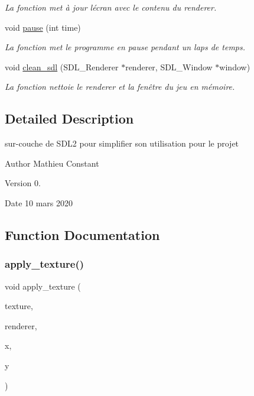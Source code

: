 \begin{DoxyCompactItemize}
\begin{DoxyCompactList}\small\item\em La fonction met à jour l\textquotesingle{}écran avec le contenu du renderer. \end{DoxyCompactList}\item 
void \hyperlink{sdl2-light_8c_a381e2d58c3d6a1f0fd8129bcc4726804}{pause} (int time)
\begin{DoxyCompactList}\small\item\em La fonction met le programme en pause pendant un laps de temps. \end{DoxyCompactList}\item 
void \hyperlink{sdl2-light_8c_a69f5b063948b40b1bac5bb2518ed9e52}{clean\+\_\+sdl} (S\+D\+L\+\_\+\+Renderer $\ast$renderer, S\+D\+L\+\_\+\+Window $\ast$window)
\begin{DoxyCompactList}\small\item\em La fonction nettoie le renderer et la fenêtre du jeu en mémoire. \end{DoxyCompactList}\end{DoxyCompactItemize}


\subsection{Detailed Description}
sur-\/couche de S\+D\+L2 pour simplifier son utilisation pour le projet 

\begin{DoxyAuthor}{Author}
Mathieu Constant 
\end{DoxyAuthor}
\begin{DoxyVersion}{Version}
0. 
\end{DoxyVersion}
\begin{DoxyDate}{Date}
10 mars 2020 
\end{DoxyDate}


\subsection{Function Documentation}
\mbox{\label{sdl2-light_8c_aa94de38ff23c16e13439cbe9cea15256}} 
\subsubsection{\texorpdfstring{apply\+\_\+texture()}{apply\_texture()}}
{\footnotesize\ttfamily void apply\+\_\+texture (\begin{DoxyParamCaption}\item[{S\+D\+L\+\_\+\+Texture $\ast$}]{texture,  }\item[{S\+D\+L\+\_\+\+Renderer $\ast$}]{renderer,  }\item[{int}]{x,  }\item[{int}]{y }\end{DoxyParamCaption})}



